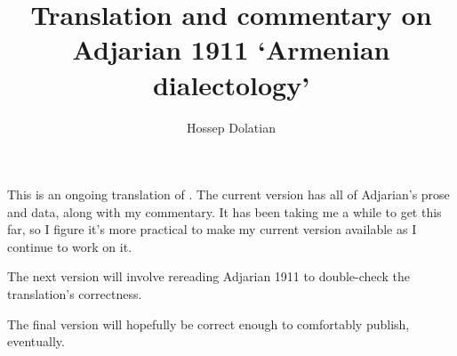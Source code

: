 \documentclass{book}
\title{Translation and commentary  on Adjarian 1911 `Armenian dialectology'}	%
\author{Hossep Dolatian}		%
\begin{document}
 










\maketitle

This is an ongoing translation of \citet{Adjarian-1911-DialectologyBook}. The current version has all of Adjarian's prose and data, along with my commentary. It has been taking me a while to get this far, so I figure it's more practical to make my current version available as I continue to work on it.

The next version will involve rereading Adjarian 1911 to double-check the translation's correctness.

The final version  will hopefully be correct enough to comfortably publish, eventually. 





\tableofcontents





 


\newcommand{\doi}[1]{\href{http://dx.doi.org/#1}{http://dx.doi.org/#1}}	%
\end{document}
